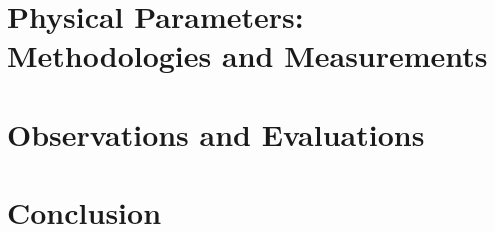 \documentclass{article}
\begin{document}
\section{Physical Parameters: Methodologies and Measurements}

\clearpage
\section{Observations and Evaluations}

\clearpage
\section{Conclusion}

\clearpage


\end{document}
